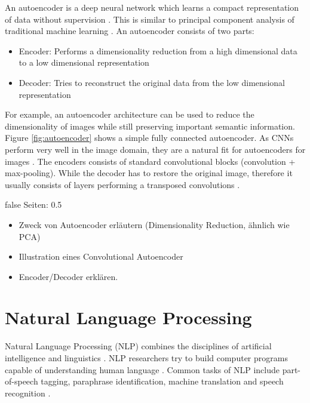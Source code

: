 \documentclass[draft,final,oneside]{vutinfth} %
\begin{document}
An autoencoder is a deep neural network which learns a compact representation of data without supervision \cite{Goodfellow-et-al-2016}. This is similar to principal component analysis of traditional machine learning \cite{bishop}. An autoencoder consists of two parts:

\begin{itemize}
\item Encoder: Performs a dimensionality reduction from a high dimensional data to a low dimensional representation \cite{Goodfellow-et-al-2016}
\item Decoder: Tries to reconstruct the original data from the low dimensional representation \cite{Goodfellow-et-al-2016}
\end{itemize}

For example, an autoencoder architecture can be used to reduce the dimensionality of images while still preserving important semantic information. Figure \ref{fig:autoencoder} shows a simple fully connected autoencoder. As CNNs perform very well in the image domain, they are a natural fit for autoencoders for images \cite{alexnet}. The encoders consists of standard convolutional blocks (convolution + max-pooling). While the decoder has to restore the original image, therefore it usually consists of layers performing a transposed convolutions \cite{dlvc}. 

\if false
Seiten: 0.5
\begin{itemize}
\item Zweck von Autoencoder erläutern (Dimensionality Reduction, ähnlich wie PCA)
\item Illustration eines Convolutional Autoencoder
\item Encoder/Decoder erklären.
\end{itemize}
\fi


\section{Natural Language Processing} \label{nlpbackground}

Natural Language Processing (NLP) combines the disciplines of artificial intelligence and linguistics \cite{statisticalnlp}\cite{speechandlanguageprocessing}. NLP researchers try to build computer programs capable of understanding human language \cite{speechandlanguageprocessing}. Common tasks of NLP include part-of-speech tagging, paraphrase identification, machine translation and speech recognition \cite{surveynlp}\cite{nmt}\cite{googlespeech}\cite{speech}\cite{paraphrase}.
\end{document}
